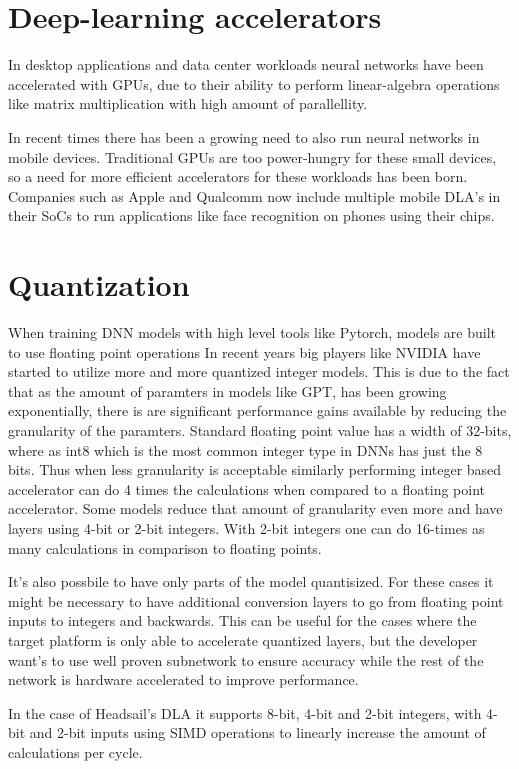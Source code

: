 \documentclass[12pt,a4paper,english
]{tunithesis}
\begin{document}
\section{Deep-learning accelerators}
\label{sec:dlas}
In desktop applications and data center workloads neural networks have been accelerated with GPUs, due to their ability to perform linear-algebra operations like matrix multiplication with high amount of parallellity.

In recent times there has been a growing need to also run neural networks in mobile devices. Traditional GPUs are too power-hungry for these small devices, so a need for more efficient accelerators for these workloads has been born. Companies such as Apple and Qualcomm now include multiple mobile DLA's in their SoCs to run applications like face recognition on phones using their chips.

\section{Quantization}
When training DNN models with high level tools like Pytorch, models are built to use floating point operations In recent years big players like NVIDIA have started to utilize more and more quantized integer models. This is due to the fact that as the amount of paramters in models like GPT, has been growing exponentially, there is are significant performance gains available by reducing the granularity of the paramters. Standard floating point value has a width of 32-bits, where as int8 which is the most common integer type in DNNs has just the 8 bits. Thus when less granularity is acceptable similarly performing integer based accelerator can do 4 times the calculations when compared to a floating point accelerator.
Some models reduce that amount of granularity even more and have layers using 4-bit or 2-bit integers. With 2-bit integers one can do 16-times as many calculations in comparison to floating points.

It's also possbile to have only parts of the model quantisized. For these cases it might be necessary to have additional conversion layers to go from floating point inputs to integers and backwards. This can be useful for the cases where the target platform is only able to accelerate quantized layers, but the developer want's to use well proven subnetwork to ensure accuracy while the rest of the network is hardware accelerated to improve performance.

In the case of Headsail's DLA it supports 8-bit, 4-bit and 2-bit integers, with 4-bit and 2-bit inputs using SIMD operations to linearly increase the amount of calculations per cycle.
\end{document}
